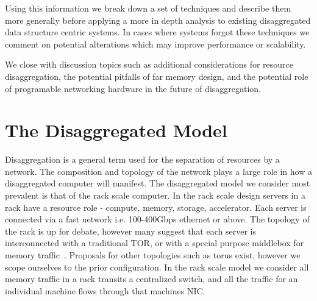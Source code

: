 Using this information we break down a set of techniques and describe them more
generally before applying a more in depth analysis to existing disaggregated
data structure centric systems. In cases where systems forgot these techniques
we comment on potential alterations which may improve performance or
scalability.

We close with discussion topics such as additional considerations for resource
disaggregation, the potential pitfalls of far memory design, and the potential
role of programable networking hardware in the future of disaggregation.





\section{The Disaggregated Model}

Disaggregation is a general term used for the separation
of resources by a network. The composition and topology of the network plays a
large role in how a disaggregated computer will manifest. The disaggregated
model we consider most prevalent is that of the rack scale computer. In the rack
scale design servers in a rack have a resource role - compute, memory, storage,
accelerator. Each server is connected via a fast network i.e. 100-400Gbps
ethernet or above. The topology of the rack is up for debate, however many
suggest that each server is interconnected with a traditional TOR, or with a
special purpose middlebox for memory traffic~\cite{disandapp}. Proposals for
other topologies such as torus exist, however we scope ourselves to the prior
configuration. In the rack scale model we consider all memory traffic in a rack
transits a centralized switch, and all the traffic for an individual machine
flows through that machines NIC.

